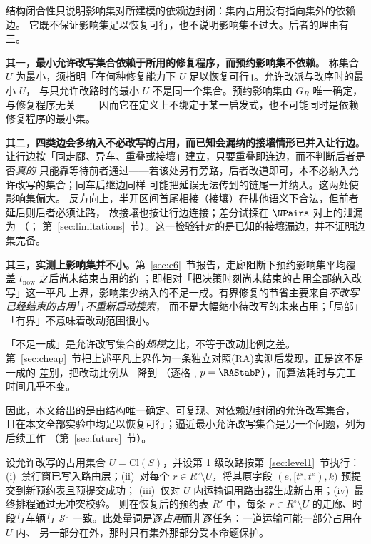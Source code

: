 \begin{remark}[预约影响集与最小允许改写集合]
\label{rem:minimality}
结构闭合性只说明影响集对所建模的依赖边封闭：集内占用没有指向集外的依赖边。
它既不保证影响集足以恢复可行，也不说明影响集不过大。后者的理由有三。

其一，\textbf{最小允许改写集合依赖于所用的修复程序，而预约影响集不依赖}。
称集合 \(U\) 为最小，须指明「在何种修复能力下 \(U\) 足以恢复可行」。允许改派与改序时的最小 \(U\)，
与只允许改路时的最小 \(U\) 不是同一个集合。预约影响集由 \(G_R\) 唯一确定，与修复程序无关——
因而它在定义上不绑定于某一启发式，也不可能同时是依赖修复程序的最小集。

其二，\textbf{四类边会多纳入不必改写的占用，而已知会漏纳的接壤情形已并入让行边}。
让行边按「同走廊、异车、重叠或接壤」建立，只要重叠即连边，而不判断后者是否\emph{真的}
只能靠等待前者通过——若该处另有旁路，后者改道即可，本不必纳入允许改写的集合；同车后继边同样
可能把延误无法传到的链尾一并纳入。这两处使影响集偏大。
反方向上，半开区间首尾相接（接壤）在排他语义下合法，但前者延后则后者必须让路，
故接壤也按让行边连接；差分试探在 \(\NPairs\) 对上的泄漏为 \ProbeLeaks（\ProbeLeakPairs；
第~\ref{sec:limitations}~节）。这一检验针对的是已知的接壤漏边，并不证明边集完备。

其三，\textbf{实测上影响集并不小}。第~\ref{sec:e6}~节报告，走廊阻断下预约影响集平均覆盖
\(t_{\mathrm{now}}\) 之后尚未结束占用的约 \ClosureAliveFrac；即相对「把决策时刻尚未结束的占用全部纳入改写」这一平凡
上界，影响集少纳入的不足一成。有界修复的节省主要来自\emph{不改写已经结束的占用}与\emph{不重新启动搜索}，
而不是大幅缩小待改写的未来占用；「局部」「有界」不意味着改动范围很小。

「不足一成」是允许改写集合的\emph{规模}之比，不等于改动比例之差。
第~\ref{sec:cheap}~节把上述平凡上界作为一条独立对照(RA)实测后发现，正是这不足一成的
差别，把改动比例从 \ResFracAllFuture\ 降到 \ResFracCheapRtwo（逐格 \RAStabWTL,
\(p=\RAStabP\)），而算法耗时与完工时间几乎不变。

因此，本文给出的是由结构唯一确定、可复现、对依赖边封闭的允许改写集合，
且在本文全部实验中均足以恢复可行；逼近最小允许改写集合是另一个问题，列为后续工作
（第~\ref{sec:future}~节）。
\end{remark}

\begin{prop}[外侧字段不变的充分条件]
\label{prop:outside}
设允许改写的占用集合 \(U=\mathrm{Cl}(S)\)，并设第 1 级改路按第~\ref{sec:level1}~节执行：
(i)~禁行窗已写入路由层；(ii)~对每个 \(r\in R^{\circ}\setminus U\)，将其原字段
\((e,[t^s,t^e),k)\) 预提交到新预约表且预提交成功；
(iii)~仅对 \(U\) 内运输调用路由器生成新占用；(iv)~最终排程通过无冲突校验。
则在恢复后的预约表 \(R'\) 中，每条 \(r\in R^{\circ}\setminus U\) 的走廊、时段与车辆与
\(\mathcal{S}^0\) 一致。此处量词是逐\emph{占用}而非逐任务：一道运输可能一部分占用在 \(U\) 内、
另一部分在外，那时只有集外那部分受本命题保护。
\end{prop}

